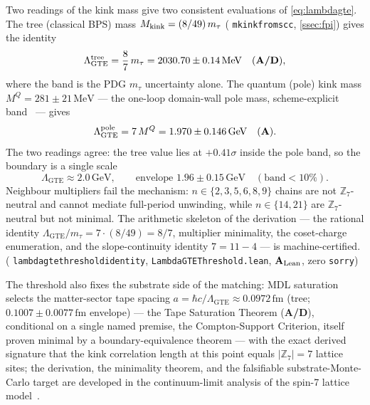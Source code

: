 \documentclass[11pt]{article}
\theoremstyle{remark}
\newcommand{\GTE}{\text{GTE}}
\newcommand{\ZS}{\mathbb{Z}_7}
\newcommand{\lean}[1]{%
  \penalty-100
  \begingroup\def\_{\textunderscore\allowbreak}\texttt{#1}\endgroup}
\newcommand{\CatA}{\textbf{A}}
\newcommand{\CatAL}{\ensuremath{\textbf{A}_{\rm Lean}}}
\newcommand{\CatAD}{\textbf{A/D}}
\begin{document}
Two readings of the kink mass give two consistent evaluations of
\cref{eq:lambdagte}.
The tree (classical BPS) mass $M_{\rm kink} = (8/49)\,m_\tau$
(\lean{mkink\_from\_scc}, \cref{ssec:fpi}) gives the identity
\begin{equation}
  \Lambda_{\GTE}^{\rm tree} = \frac{8}{7}\,m_\tau
    = 2030.70 \pm 0.14\,\mathrm{MeV} \quad (\CatAD{}),
  \label{eq:lambdagtetree}
\end{equation}
where the band is the PDG $m_\tau$ uncertainty alone.
The quantum (pole) kink mass $M^Q = 281 \pm 21\,\mathrm{MeV}$ --- the one-loop
domain-wall pole mass, scheme-explicit band~\cite{SpivackPhiMDLField} --- gives
\begin{equation}
  \Lambda_{\GTE}^{\rm pole} = 7\,M^Q
    = 1.970 \pm 0.146\,\mathrm{GeV} \quad (\CatA{}).
  \label{eq:lambdagtepole}
\end{equation}
The two readings agree: the tree value lies at $+0.41\sigma$ inside the pole
band, so the boundary is a single scale
\begin{equation}
  \Lambda_{\GTE} \approx 2.0\,\mathrm{GeV},
  \qquad \text{envelope } 1.96 \pm 0.15\,\mathrm{GeV}
  \quad (\text{band} < 10\%).
  \label{eq:lambdagteenvelope}
\end{equation}
Neighbour multipliers fail the mechanism: $n \in \{2,3,5,6,8,9\}$ chains are
not $\ZS$-neutral and cannot mediate full-period unwinding, while $n \in
\{14, 21\}$ are $\ZS$-neutral but not minimal.
The arithmetic skeleton of the derivation --- the rational identity
$\Lambda_{\GTE}/m_\tau = 7 \cdot (8/49) = 8/7$, multiplier minimality, the
coset-charge enumeration, and the slope-continuity identity $7 = 11 - 4$
--- is machine-certified.\\
(\lean{lambda\_gte\_threshold\_identity}, \lean{LambdaGTEThreshold.lean},
\CatAL{}, zero \texttt{sorry})

The threshold also fixes the substrate side of the matching: MDL saturation
selects the matter-sector tape spacing $a = \hbar c/\Lambda_{\GTE} \approx
0.0972\,\mathrm{fm}$ (tree; $0.1007 \pm 0.0077\,\mathrm{fm}$ envelope) --- the
Tape Saturation Theorem (\CatAD{}), conditional on a single named premise, the
Compton-Support Criterion, itself proven minimal by a boundary-equivalence
theorem --- with the exact derived signature that the kink correlation length
at this point equals $|\ZS| = 7$ lattice sites; the derivation, the minimality
theorem, and the falsifiable substrate-Monte-Carlo target are developed in the
continuum-limit analysis of the spin-7 lattice model~\cite{SpivackSpin7Lattice}.
\end{document}
